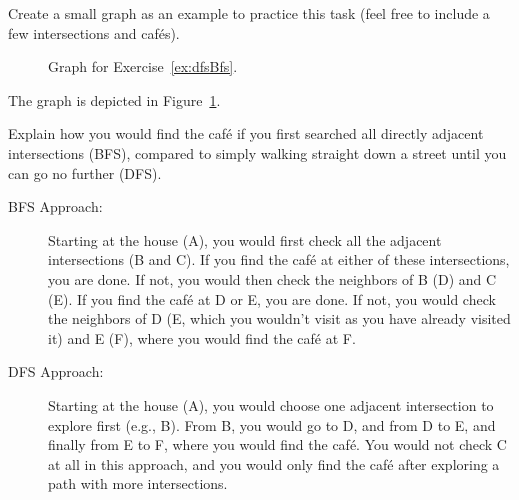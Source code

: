\begin{ejercicio}\label{ex:dfsBfs}
    Create a small graph as an example to practice this task (feel free to include a few intersections and cafés).
    \begin{figure}
        \centering
        \caption{Graph for Exercise~\ref{ex:dfsBfs}.}
        \label{fig:dfsBfsGraph}
    \end{figure}

    The graph is depicted in Figure~\ref{fig:dfsBfsGraph}. 
\end{ejercicio}

\begin{ejercicio}[Approach]
    Explain how you would find the café if you first searched all directly adjacent intersections (BFS), compared to simply walking straight down a street until you can go no further (DFS).
    \begin{description}
        \item[BFS Approach:] Starting at the house (A), you would first check all the adjacent intersections (B and C). If you find the café at either of these intersections, you are done. If not, you would then check the neighbors of B (D) and C (E). If you find the café at D or E, you are done. If not, you would check the neighbors of D (E, which you wouldn't visit as you have already visited it) and E (F), where you would find the café at F.
        
        \item[DFS Approach:] Starting at the house (A), you would choose one adjacent intersection to explore first (e.g., B). From B, you would go to D, and from D to E, and finally from E to F, where you would find the café. You would not check C at all in this approach, and you would only find the café after exploring a path with more intersections.
    \end{description}
\end{ejercicio}

